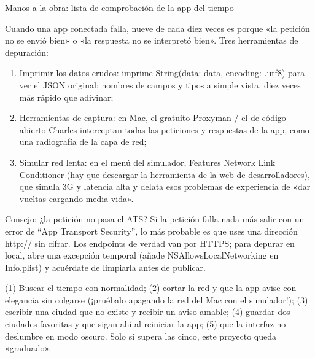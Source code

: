 \begin{tcbpractice}{Manos a la obra: lista de comprobación de la app del tiempo}

Cuando una app conectada falla, nueve de cada diez veces es porque «la petición no se envió bien» o «la respuesta no se interpretó bien». Tres herramientas de depuración:

\begin{enumerate}
  \item Imprimir los datos crudos: imprime String(data: data, encoding: .utf8) para ver el JSON original: nombres de campos y tipos a simple vista, diez veces más rápido que adivinar;
  \item Herramientas de captura: en Mac, el gratuito Proxyman / el de código abierto Charles interceptan todas las peticiones y respuestas de la app, como una radiografía de la capa de red;
  \item Simular red lenta: en el menú del simulador, Features Network Link Conditioner (hay que descargar la herramienta de la web de desarrolladores), que simula 3G y latencia alta y delata esos problemas de experiencia de «dar vueltas cargando media vida».
\end{enumerate}

\begin{tcbinfo}{Consejo: ¿la petición no pasa el ATS?}
Si la petición falla nada más salir con un error de “App Transport Security”, lo más probable es que uses una dirección http:// sin cifrar. Los endpoints de verdad van por HTTPS; para depurar en local, abre una excepción temporal (añade NSAllowsLocalNetworking en Info.plist) y acuérdate de limpiarla antes de publicar.

\end{tcbinfo}

(1) Buscar el tiempo con normalidad; (2) cortar la red y que la app avise con elegancia sin colgarse (¡pruébalo apagando la red del Mac con el simulador!); (3) escribir una ciudad que no existe y recibir un aviso amable; (4) guardar dos ciudades favoritas y que sigan ahí al reiniciar la app; (5) que la interfaz no deslumbre en modo oscuro. Solo si supera las cinco, este proyecto queda «graduado».

\end{tcbpractice}

